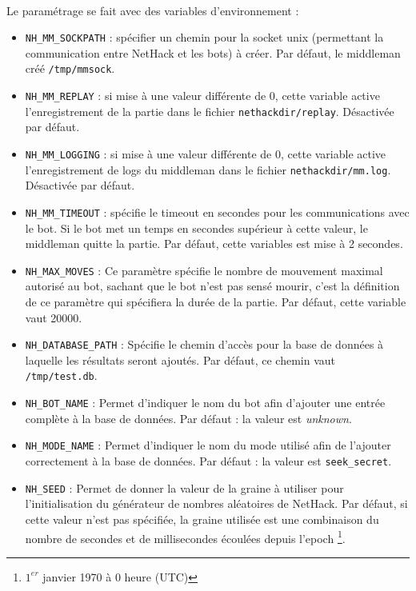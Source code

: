 \documentclass[a4paper,12pt]{article}
\begin{document}
\paragraph{}Le paramétrage se fait avec des variables d'environnement :
\begin{itemize}
\item \verb!NH_MM_SOCKPATH! : spécifier un chemin pour la socket unix
	(permettant la communication entre NetHack et les bots) à créer. Par
	défaut, le middleman créé {\verb|/tmp/mmsock|}.
\item \verb!NH_MM_REPLAY! : si mise à une valeur différente de 0, cette
	variable active l'enregistrement de la partie dans le fichier
	{\verb|nethackdir/replay|}. Désactivée par défaut.
\item \verb!NH_MM_LOGGING! : si mise à une valeur différente de 0, cette
	variable active l'enregistrement de logs du middleman dans le fichier
	{\verb|nethackdir/mm.log|}. Désactivée par défaut.
\item \verb!NH_MM_TIMEOUT! : spécifie le timeout en secondes pour les
	communications avec le bot. Si le bot met un temps en secondes supérieur à
	cette valeur, le middleman quitte la partie. Par défaut, cette variables
	est mise à 2 secondes.
\item \verb!NH_MAX_MOVES! :
  Ce paramètre spécifie le nombre de mouvement maximal autorisé au bot, sachant
  que le bot n'est pas sensé mourir, c'est la définition de ce paramètre qui
  spécifiera la durée de la partie. Par défaut, cette variable vaut 20000.
\item \verb!NH_DATABASE_PATH! :
  Spécifie le chemin d'accès pour la base de données à laquelle les résultats
  seront ajoutés. Par défaut, ce chemin vaut {\verb|/tmp/test.db|}.
\item \verb!NH_BOT_NAME! :
  Permet d'indiquer le nom du bot afin d'ajouter une entrée complète à la base
  de données. Par défaut : la valeur est \emph{unknown}.
\item \verb!NH_MODE_NAME! :
  Permet d'indiquer le nom du mode utilisé afin de l'ajouter correctement à la
  base de données. Par défaut : la valeur est {\verb|seek_secret|}.
\item \verb!NH_SEED! :
  Permet de donner la valeur de la graine à utiliser pour l'initialisation du
  générateur de nombres aléatoires de NetHack. Par défaut, si cette
  valeur n'est pas spécifiée, la graine utilisée est une combinaison du nombre
  de secondes et de millisecondes écoulées depuis l'epoch \footnote{$1^{er}$
  janvier 1970 à 0 heure (UTC)}.

\end{itemize}
\end{document}
